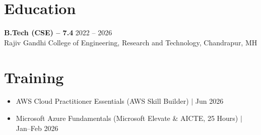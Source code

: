 \documentclass[a4paper,10pt]{article}
\begin{document}
\section*{Education}
\textbf{B.Tech (CSE) -- 7.4} \hfill 2022 -- 2026 \\
Rajiv Gandhi College of Engineering, Research and Technology, Chandrapur, MH

\section*{Training}
\begin{itemize}
  \item AWS Cloud Practitioner Essentials (AWS Skill Builder) $|$ Jun 2026
  \item Microsoft Azure Fundamentals (Microsoft Elevate \& AICTE, 25 Hours) $|$ Jan--Feb 2026
\end{itemize}
\end{document}
